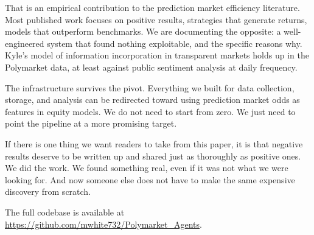 \documentclass[conference]{IEEEtran}
\begin{document}
That is an empirical contribution to the prediction market efficiency literature. Most published work focuses on positive results, strategies that generate returns, models that outperform benchmarks. We are documenting the opposite: a well-engineered system that found nothing exploitable, and the specific reasons why. Kyle's model of information incorporation in transparent markets holds up in the Polymarket data, at least against public sentiment analysis at daily frequency.

The infrastructure survives the pivot. Everything we built for data collection, storage, and analysis can be redirected toward using prediction market odds as features in equity models. We do not need to start from zero. We just need to point the pipeline at a more promising target.

If there is one thing we want readers to take from this paper, it is that negative results deserve to be written up and shared just as thoroughly as positive ones. We did the work. We found something real, even if it was not what we were looking for. And now someone else does not have to make the same expensive discovery from scratch.

The full codebase is available at \url{https://github.com/mwhite732/Polymarket_Agents}.
\end{document}
